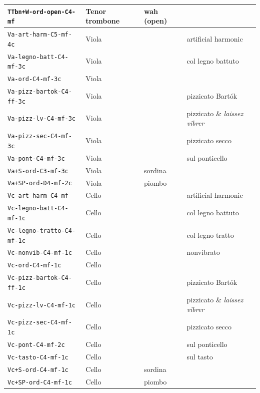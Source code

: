 \documentclass{bmcart}
\begin{document}
\begin{backmatter}
\begin{table}
\begin{tabular}{llll}
        \texttt{TTbn+W-ord-open-C4-mf} & Tenor trombone & wah (open) & \\ \hline
        \texttt{Va-art-harm-C5-mf-4c} & Viola & & artificial harmonic \\
        \texttt{Va-legno-batt-C4-mf-3c} & Viola & & col legno battuto \\
        \texttt{Va-ord-C4-mf-3c} & Viola & & \\
        \texttt{Va-pizz-bartok-C4-ff-3c} & Viola & & pizzicato Bart\'ok \\
        \texttt{Va-pizz-lv-C4-mf-3c} & Viola & & pizzicato \& \emph{laissez vibrer} \\
        \texttt{Va-pizz-sec-C4-mf-3c} & Viola & & pizzicato secco \\
        \texttt{Va-pont-C4-mf-3c} & Viola & & sul ponticello \\
        \texttt{Va+S-ord-C3-mf-3c} & Viola & sordina & \\
        \texttt{Va+SP-ord-D4-mf-2c} & Viola & piombo & \\ \hline
        \texttt{Vc-art-harm-C4-mf} & Cello & & artificial harmonic \\
        \texttt{Vc-legno-batt-C4-mf-1c} & Cello & & col legno battuto \\
        \texttt{Vc-legno-tratto-C4-mf-1c} & Cello & & col legno tratto \\
        \texttt{Vc-nonvib-C4-mf-1c} & Cello & & nonvibrato \\
        \texttt{Vc-ord-C4-mf-1c} & Cello & & \\
        \texttt{Vc-pizz-bartok-C4-ff-1c} & Cello & & pizzicato Bart\'ok \\
        \texttt{Vc-pizz-lv-C4-mf-1c} & Cello & & pizzicato \& \emph{laissez vibrer} \\
        \texttt{Vc-pizz-sec-C4-mf-1c} & Cello & & pizzicato secco \\
        \texttt{Vc-pont-C4-mf-2c} & Cello & & sul ponticello \\
        \texttt{Vc-tasto-C4-mf-1c} & Cello & & sul tasto \\
        \texttt{Vc+S-ord-C4-mf-1c} & Cello & sordina & \\
        \texttt{Vc+SP-ord-C4-mf-1c} & Cello & piombo & \\ \hline
    \end{tabular}
\end{table}


\end{backmatter}
\end{document}
